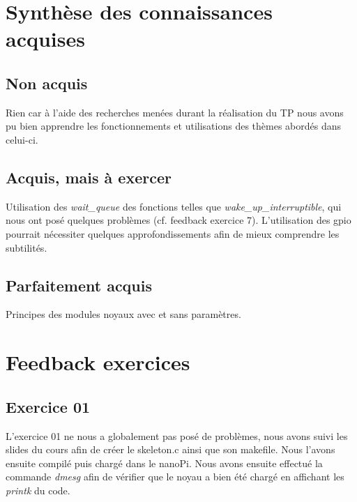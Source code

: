 \documentclass{ReportTemplate}
\begin{document}
\section{Synthèse des connaissances acquises}
\subsection{Non acquis}
Rien car à l'aide des recherches menées durant la réalisation du TP nous avons
pu bien apprendre les fonctionnements et utilisations des thèmes abordés dans celui-ci.
\subsection{Acquis, mais à exercer}
Utilisation des \textit{wait\_queue} des fonctions telles que
\textit{wake\_up\_interruptible}, qui nous ont posé quelques problèmes (cf.
feedback exercice 7). \newline
L'utilisation des gpio pourrait nécessiter quelques approfondissements afin de
mieux comprendre les subtilités.
\subsection{Parfaitement acquis}
Principes des modules noyaux avec et sans paramètres.
\section{Feedback exercices}
\subsection{Exercice 01}
L'exercice 01 ne nous a globalement pas posé de problèmes, nous avons suivi les
slides du cours afin de créer le skeleton.c ainsi que son makefile. Nous l'avons
ensuite compilé puis chargé dans le nanoPi. Nous avons ensuite effectué la
commande \textit{dmesg} afin de vérifier que le noyau a bien été chargé en
affichant les \textit{printk} du code.
\end{document}
